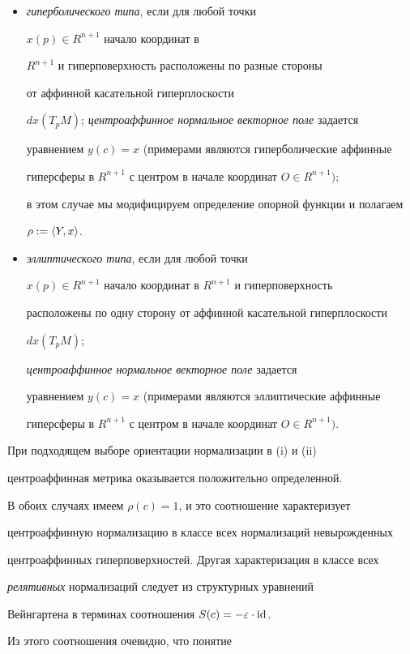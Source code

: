 \begin{itemize}


\item[(i)] {\it гиперболического типа}, если для любой точки


$x(p) \in R^{n+1}$ начало координат в


$R^{n+1}$ и гиперповерхность расположены по разные стороны


от аффинной касательной гиперплоскости


$dx(T_p M)$; {\it центроаффинное нормальное векторное поле} задается


уравнением $y(c)=x$ (примерами являются гиперболические аффинные


гиперсферы в $R^{n+1}$ с центром в начале координат $O \in R^{n+1});$


в этом случае мы модифицируем определение опорной функции и полагаем


$\rho := \langle Y,x\rangle$.


\item[(ii)] {\it эллиптического типа}, если для любой точки


$x(p) \in R^{n+1}$ начало координат в $R^{n+1}$ и гиперповерхность


расположены по одну сторону от аффинной касательной гиперплоскости


$dx(T_p M)$;


{\it центроаффинное нормальное векторное поле} задается


уравнением $y(c)=x$ (примерами являются эллиптические аффинные


гиперсферы в $R^{n+1}$ с центром в начале координат $O\in R^{n+1})$.


\end{itemize}


При подходящем выборе ориентации нормализации в (i) и (ii)


центроаффинная метрика оказывается положительно определенной.


В обоих случаях имеем $\rho (c) =1$, и это соотношение характеризует


центроаффинную нормализацию в классе всех нормализаций невырожденных


центроаффинных гиперповерхностей. Другая характеризация в классе всех


{\it релятивных} нормализаций следует из структурных уравнений


Вейнгартена в терминах соотношения $S(c) = - \varepsilon \cdot \operatorname{id}$.


Из этого соотношения очевидно, что понятие


